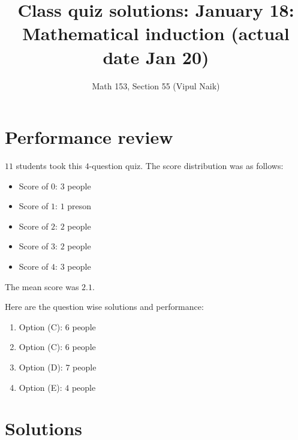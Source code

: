 \documentclass[10pt]{amsart}
\title{Class quiz solutions: January 18: Mathematical induction (actual date Jan 20)}
\author{Math 153, Section 55 (Vipul Naik)}
\begin{document}
\maketitle

\section{Performance review}

$11$ students took this $4$-question quiz. The score distribution was
as follows:

\begin{itemize}
\item Score of $0$: $3$ people
\item Score of $1$: $1$ preson
\item Score of $2$: $2$ people
\item Score of $3$: $2$ people
\item Score of $4$: $3$ people
\end{itemize}

The mean score was $2.1$.

Here are the question wise solutions and performance:

\begin{enumerate}
\item Option (C): $6$ people
\item Option (C): $6$ people
\item Option (D): $7$ people
\item Option (E): $4$ people
\end{enumerate}

\section{Solutions}
\end{document}
